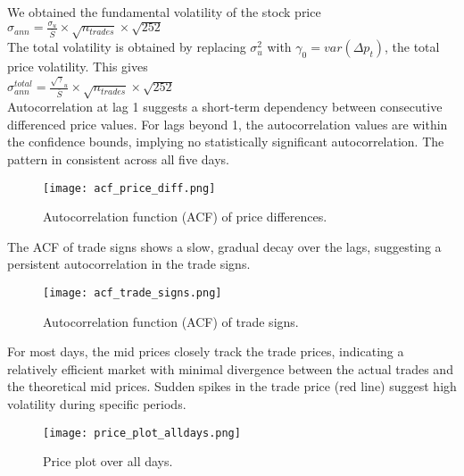 \documentclass{article}
\begin{document}
We obtained the fundamental volatility of the stock price $\sigma_{ann} = \frac{\sigma_u}{\overline{S}} \times \sqrt{n_{trades}} \times \sqrt{252}$ \\

The total volatility is obtained by replacing $\sigma_u^2$ with $\gamma_0=var(\Delta p_t)$, the total price volatility. This gives \\

$\sigma_{ann}^{total} = \frac{\sqrt\gamma_u}{\overline{S}} \times \sqrt{n_{trades}} \times \sqrt{252}$ \\


Autocorrelation at lag 1 suggests a short-term dependency between consecutive differenced price values. For lags beyond 1, the autocorrelation values are within the confidence bounds, implying no statistically significant autocorrelation. The pattern in consistent across all five days.

\begin{figure}[H]
\centering
\begin{adjustbox}{max width=\textwidth}
    \texttt{[image: acf\_price\_diff.png]}
\end{adjustbox}
\caption{Autocorrelation function (ACF) of price differences.}
\label{fig:acf_price_diff}
\end{figure}

The ACF of trade signs shows a slow, gradual decay over the lags, suggesting a persistent autocorrelation in the trade signs.


\begin{figure}[H]
\centering
\begin{adjustbox}{max width=\textwidth}
    \texttt{[image: acf\_trade\_signs.png]}
\end{adjustbox}
\caption{Autocorrelation function (ACF) of trade signs.}
\label{fig:acf_trade_signs}
\end{figure}

For most days, the mid prices closely track the trade prices, indicating a relatively efficient market with minimal divergence between the actual trades and the theoretical mid prices. Sudden spikes in the trade price (red line) suggest high volatility during specific periods.

\begin{figure}[H]
\centering
\begin{adjustbox}{max width=\textwidth}
    \texttt{[image: price\_plot\_alldays.png]}
\end{adjustbox}
\caption{Price plot over all days.}
\label{fig:price_plot_alldays}
\end{figure}
\end{document}
